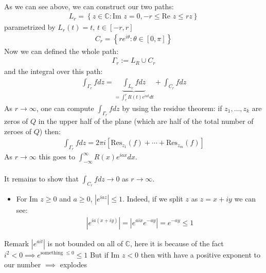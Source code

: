 \begin{parag}{$ $}
    
	As we can see above, we can construct our two paths:
	\begin{align*} 
		L_r =  \left\{z \in \mathbb{C}: \text{Im } z = 0, -r \leq \text{Re } z \leq rz\right\}
	\end{align*}
	parametrized by $L_r\left(t\right) = t$, $t \in \left[-r, r\right]$
	\begin{align*} 
		C_r =  \left\{re^{i\theta}: \theta \in \left[0, \pi\right]\right\} 
	\end{align*}
	Now we can defined the whole path:
	\begin{align*} 
		\Gamma_r := L_R \cup C_r
	\end{align*}
	and the integral over this path:
	\begin{align*} 
		\int_{\Gamma_r}fdz =  \underbrace{\int_{L_r} fdz}_{= \int_r^{r}R\left(t\right)e^{iat}dt} + \int_{C_r}fdz
	\end{align*}
	As $r \to \infty$, one can compute $\int_{\Gamma_r}fdz$ by using the residue theorem: if $z_1, \ldots, z_k$ are zeros of $Q$ in the upper half of the plane (which are half of the total number of zeroes of $Q$) then:
	\begin{align*} 
		\int_{\Gamma_r}fdz =  2\pi i \left[\text{Res}_{z_1}\left(f\right) + \cdots + \text{Res}_{z_m}\left(f\right)\right]
	\end{align*}
	As $r \to \infty$ this goes to $\int_{-\infty}^{\infty}R\left(x\right)e^{iax}dx$.\\
	$ $\\
	It remains to show that $\int_{C_r}fdz \to 0$ as $r \to \infty$.
	\begin{itemize}
	    \item For $\text{Im }z \geq 0$ and $a \geq 0$, $\left|e^{iaz}\right| \leq 1$. Indeed, if we split $z$ as $z = x + iy$ we can see:
			\begin{align*} 
				\left|e^{ia(x + iy)}\right|= \left|e^{aix}e^{-ay}\right| = e^{-ay} \leq 1
			\end{align*}
	\end{itemize}
	\begin{subparag}{Remark}
		$\left|e^{ait}\right|$ is not bounded on all of $\mathbb{C}$, here it is because of the fact $i^2 < 0 \implies e^{\text{something } \leq 0} \leq 1$ But if $\text{Im }z < 0$ then with have a positive exponent to our number $\implies$ explodes
	\end{subparag}
	\begin{itemize}

\end{itemize}
\end{parag}
